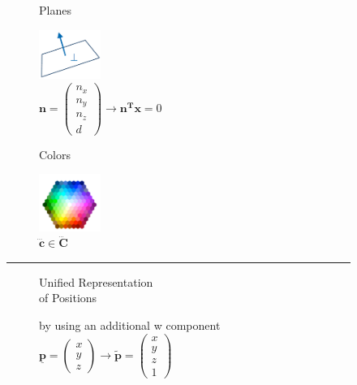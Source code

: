 \begin{figure}[t]
	\begin{subfigure}[t]{0.4\textwidth}
			\centering
			\large
			\begin{bfseries}
				\textcolor{cddarkblue}{Planes} \\
			\end{bfseries}
			\normalsize
			\smallskip
			\includegraphics[width=2cm]{fig/plane.png} \\
			\smallskip
			$\bm{n}=\begin{pmatrix} n_x\\ n_y\\ n_z \\ d \end{pmatrix} \rightarrow \bm{n^Tx} = 0 $
	\end{subfigure}
	{\color{gray!10}\vrule}
	\begin{subfigure}[t]{0.4\textwidth}
			\centering
			\large
			\begin{bfseries}
				\textcolor{cddarkblue}{Colors} \\
			\end{bfseries}
			\normalsize
			\smallskip
			\includegraphics[width=2cm]{fig/col.png} \\
			\smallskip
			$\bm{\dddot{c}} \in \bm{\dddot{C}}$
	\end{subfigure}
	
	\bigskip
	{\color{gray!10}\hrule}
	\bigskip
	
	\begin{subfigure}{0.4\textwidth}
		\centering
		\large
		\begin{bfseries}
			\textcolor{cddarkblue}{Unified Representation \\ of Positions} \\
		\end{bfseries}
		\footnotesize
		by using an additional w component	\\	
		$\bm{\underline{p}}=\begin{pmatrix} x\\ y\\ z \end{pmatrix} \rightarrow \bm{\widetilde{p}} = \begin{pmatrix} x\\ y\\ z \\ 1 \end{pmatrix} $


\end{subfigure}
\end{figure}
